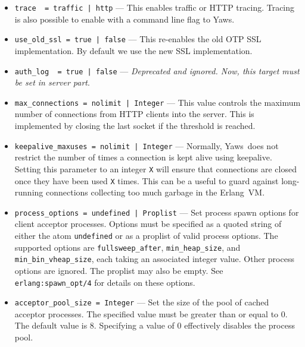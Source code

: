 \documentclass[11pt,oneside,english]{book}
\newcommand{\Erlang}            %
        {{\sc Erlang}}
\newcommand{\Yaws}            %
        {{\sc Yaws}}
\begin{document}
\begin{itemize}
\item        \verb+trace  = traffic | http+ ---
              This  enables  traffic  or HTTP tracing. Tracing is
              also possible to enable with a command line flag to
              \Yaws{}.

\item        \verb+use_old_ssl = true | false+ ---
              This re-enables the old OTP SSL implementation. By default we use
              the new SSL implementation.

\item        \verb+auth_log  = true | false+ ---
              \textit{Deprecated and ignored. Now, this target must be set in
                server part}.

\item        \verb+max_connections = nolimit | Integer+ ---
              This value controls the maximum number of connections
              from HTTP clients into the server. This is implemented
              by closing the last socket if the threshold is reached.

\item        \verb+keepalive_maxuses = nolimit | Integer+ ---
              Normally, \Yaws\ does not restrict the number of times a
              connection is kept alive using keepalive. Setting this
              parameter to an integer \verb+X+ will ensure that
              connections are closed once they have been used \verb+X+
              times.  This can be a useful to guard against
              long-running connections collecting too much garbage in
              the \Erlang\ VM.

\item        \verb+process_options = undefined | Proplist+ ---
              Set process spawn options for client acceptor processes.
              Options must be specified as a quoted string of either
              the atom \verb+undefined+ or as a proplist of valid
              process options. The supported options are
              \verb+fullsweep_after+, \verb+min_heap_size+, and
              \verb+min_bin_vheap_size+, each taking an associated
              integer value. Other process options are ignored. The
              proplist may also be empty. See
              \verb+erlang:spawn_opt/4+ for details on these options.

\item        \verb+acceptor_pool_size = Integer+ ---
              Set the size of the pool of cached acceptor
              processes. The specified value must be greater than or
              equal to 0. The default value is 8. Specifying a value
              of 0 effectively disables the process pool.


\end{itemize}
\end{document}
